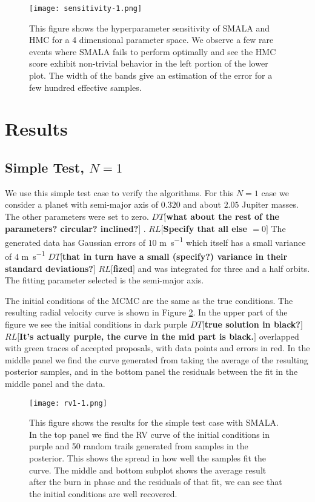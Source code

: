 \documentclass{aa}
\def\memodt#1{\color{green}$DT[${\bf #1}$]$ \color{black}}
\def\memorl#1{\color{gray}$RL[${\bf #1}$]$ \color{black}}
\begin{document}
\begin{figure}
\centering
\texttt{[image: sensitivity-1.png]}
   \caption{This figure shows the hyperparameter sensitivity of SMALA and HMC for a 4 dimensional parameter space. 
We observe a few rare events where SMALA fails to perform optimally and see the HMC score exhibit non-trivial behavior in the left portion of the lower plot. 
The width of the bands give an estimation of the error for a few hundred effective samples.}
      \label{sensfig}
\end{figure}

\section{Results}\label{results}
\subsection{Simple Test, $N=1$}
We use this simple test case to verify the algorithms.
For this $N=1$ case we consider a planet with semi-major axis of $0.320$ and about $2.05$ Jupiter masses.
The other parameters were set to zero.
\memodt{what about the rest of the parameters? circular? inclined?}.%
\memorl{Specify that all else $= 0$}
The generated data has Gaussian errors of $10$ \si{\metre\per\second} which itself has a small variance of $4$ \si{\metre\per\second} \memodt{that in turn have a small (specify?) variance in their standard deviations?}\memorl{fized} and was integrated for three and a half orbits.
The fitting parameter selected is the semi-major axis.

The initial conditions of the MCMC are the same as the true conditions. 
The resulting radial velocity curve is shown in Figure \ref{FigSimple}. 
In the upper part of the figure we see the initial conditions in dark purple \memodt{true solution in black?} \memorl{It's actually purple, the curve in the mid part is black.} overlapped with green traces of accepted proposals, with data points and errors in red. 
In the middle panel we find the curve generated from taking the average of the resulting posterior samples, and in the bottom panel the residuals between the fit in the middle panel and the data.

\begin{figure}
\centering
\texttt{[image: rv1-1.png]}
   \caption{This figure shows the results for the simple test case with SMALA. 
In the top panel we find the RV curve of the initial conditions in purple and 50 random trails generated from samples in the posterior. 
This shows the spread in how well the samples fit the curve. 
The middle and bottom subplot shows the average result after the burn in phase and the residuals of that fit, we can see that the initial conditions are well recovered.}
      \label{FigSimple}
\end{figure}
\end{document}
